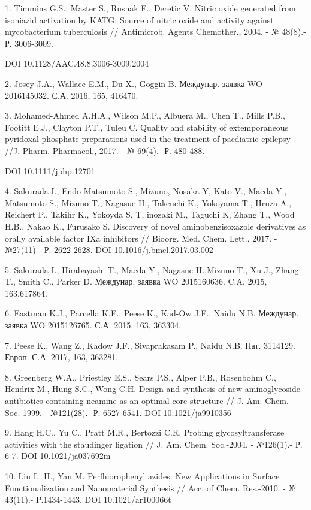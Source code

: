 \begin{noparindent}
1. Timmins G.S., Master S., Rusnak F., Deretic V. Nitric oxide generated
from isoniazid activation by KATG: Source of nitric oxide and activity
against mycobacterium tuberculosis // Antimicrob. Agents Chemother.,
2004. - № 48(8).- Р. 3006-3009.

DOI 10.1128/AAC.48.8.3006-3009.2004

2. Josey J.A., Wallace E.M., Du X., Goggin B. Междунар. заявка WO
2016145032. С.А. 2016, 165, 416470.

3. Mohamed-Ahmed A.H.A., Wilson M.P., Albuera M., Chen T., Mills P.B.,
Footitt E.J., Clayton P.T., Tuleu C. Quality and stability of
extemporaneous pyridoxal phosphate preparations used in the treatment of
paediatric epilepsy //J. Pharm. Pharmacol., 2017. - № 69(4).- Р.
480-488.

DOI 10.1111/jphp.12701

4. Sakurada I., Endo Matsumoto S., Mizuno, Nosaka Y, Kato V., Maeda Y.,
Matsumoto S., Mizuno T., Nagasue H., Takeuchi K., Yokoyama T., Hruza A.,
Reichert P., Takihr K., Yokoyda S, T, inozaki M., Taguchi K, Zhang T.,
Wood H.B., Nakao K., Furusako S. Discovery of novel aminobenzisoxazole
derivatives as orally available factor IXa inhibitors // Bioorg. Med.
Chem. Lett., 2017. - №27(11) - Р. 2622-2628. DOI
10.1016/j.bmcl.2017.03.002

5. Sakurada I., Hirabayashi T., Maeda Y., Nagasue H.,Mizuno T., Xu J.,
Zhang T., Smith C., Parker D. Междунар. заявка WO 2015160636. C.A. 2015,
163,617864.

6. Eastman K.J., Parcella K.E., Peese K., Kad-Ow J.F., Naidu N.B.
Междунар. заявка WO 2015126765. С.А. 2015, 163, 363304.

7. Peese K., Wang Z., Kadow J.F., Sivaprakasam P., Naidu N.B. Пат.
3114129. Европ. С.А. 2017, 163, 363281.

8. Greenberg W.A., Priestley E.S., Sears P.S., Alper P.B., Rosenbohm C.,
Hendrix M., Hung S.C., Wong C.H. Design and synthesis of new
aminoglycoside antibiotics containing neamine as an optimal core
structure // J. Am. Chem. Soc.-1999. - №121(28).- Р. 6527-6541. DOI
10.1021/ja9910356

9. Hang H.C., Yu C., Pratt M.R., Bertozzi C.R. Probing
glycosyltransferase activities with the staudinger ligation // J. Am.
Chem. Soc.-2004. - №126(1).- Р. 6-7. DOI 10.1021/ja037692m

10. Liu L. H., Yan M. Perfluorophenyl azides: New Applications in
Surface Functionalization and Nanomaterial Synthesis // Acc. of Chem.
Res.-2010. - № 43(11).- P.1434-1443. DOI 10.1021/ar100066t


\end{noparindent}

